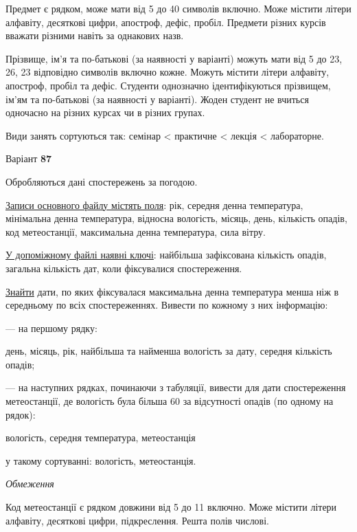 \documentclass[11pt, ukrainian]{article}
\begin{document}
Предмет є рядком, може мати від 5 до 40 символів включно.
Може містити літери алфавіту, десяткові цифри, апостроф, дефіс, пробіл.
Предмети різних курсів вважати різними навіть за однакових назв.

Прізвище, ім’я та по-батькові (за наявності у варіанті)
можуть мати від 5 до 23, 26, 23 відповідно символів включно кожне.
Можуть містити літери алфавіту, апостроф, пробіл та дефіс.
Студенти однозначно ідентифікуються прізвищем, ім’ям та по-батькові (за наявності у варіанті).
Жоден студент не вчиться одночасно на різних курсах чи в різних групах.

Види занять сортуються так: семінар < практичне < лекція < лабораторне.





\par
\newpage
{\center Варіант  \No \textbf { 87 }\par}
\bigskip
Обробляються дані спостережень за погодою. 

\underline{Записи основного файлу містять поля}: рік, середня денна температура, мінімальна денна температура, відносна вологість, місяць, день, кількість опадів, код метеостанції, максимальна денна температура, сила вітру.

\underline{У допоміжному файлі наявні ключі}: найбільша зафіксована кількість опадів, загальна кількість дат, коли фіксувалися спостереження.

\underline{Знайти} дати, по яких фіксувалася максимальна денна температура менша ніж в середньому по всіх спостереженнях. Вивести по кожному з них інформацію:\par
{\noindent}--- на першому рядку:\par
день, місяць, рік, найбільша та найменша вологість за дату, середня кількість опадів;

{\noindent}--- на наступних рядках, починаючи з табуляції, вивести для дати спостереження метеостанції, де вологість була більша 60 за відсутності опадів (по одному на рядок):\par
вологість, середня температура, метеостанція

{\noindent}у такому сортуванні: вологість, метеостанція.


\bigskip\textit{Обмеження}

Код метеостанції є рядком довжини від 5 до 11 включно.
Може містити літери алфавіту, десяткові цифри, підкреслення. Решта полів числові.
\end{document}
